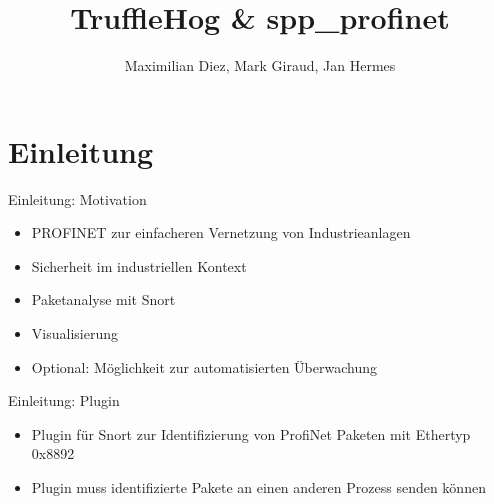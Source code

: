 \documentclass[18pt]{beamer}
\title[TruffleHog \& spp\_profinet]{TruffleHog \& spp\_profinet}
\author{Maximilian Diez, Mark Giraud, Jan Hermes}
\institute{Fraunhofer IOSB}
\begin{document}

\begin{frame}
\titlepage
\end{frame}


\section{Einleitung}
\begin{frame}{Einleitung: Motivation}
    \begin{itemize}
      \item PROFINET zur einfacheren Vernetzung von Industrieanlagen
      \pause
      \item Sicherheit im industriellen Kontext
      \pause
      \item Paketanalyse mit Snort
      \pause
      \item Visualisierung
      \pause
      \item Optional: Möglichkeit zur automatisierten Überwachung
    \end{itemize}
\end{frame}

\begin{frame}{Einleitung: Plugin}
    \begin{itemize}
      \item Plugin für Snort zur Identifizierung von ProfiNet Paketen mit Ethertyp 0x8892
      \pause
      \item Plugin muss identifizierte Pakete an einen anderen Prozess senden können
    \end{itemize}
\end{frame}
\end{document}
